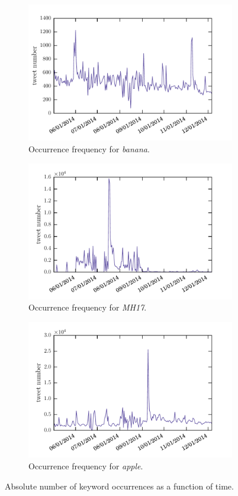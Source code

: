 \documentclass[12pt, a4paper]{article}
\begin{document}
\begin{figure}
\centering
\begin{subfigure}{.5\textwidth}
  \centering
  \includegraphics[width=.9\linewidth]{figs/banana_absolute.pdf}
  \caption{Occurrence frequency for \textit{banana}.}
  \label{fig:sub11}
\end{subfigure}%
\begin{subfigure}{.5\textwidth}
  \centering
  \includegraphics[width=.9\linewidth]{figs/mh17_absolute.pdf}
  \caption{Occurrence frequency for \textit{MH17}.}
  \label{fig:sub12}
\end{subfigure}
\begin{subfigure}{.5\textwidth}
  \centering
  \includegraphics[width=.9\linewidth]{figs/apple_absolute.pdf}
  \caption{Occurrence frequency for \textit{apple}.}
  \label{fig:sub13}
\end{subfigure}
\caption{Absolute number of keyword occurrences as a function of time.}
\label{fig:timeseries_abs}
\end{figure}
\end{document}
